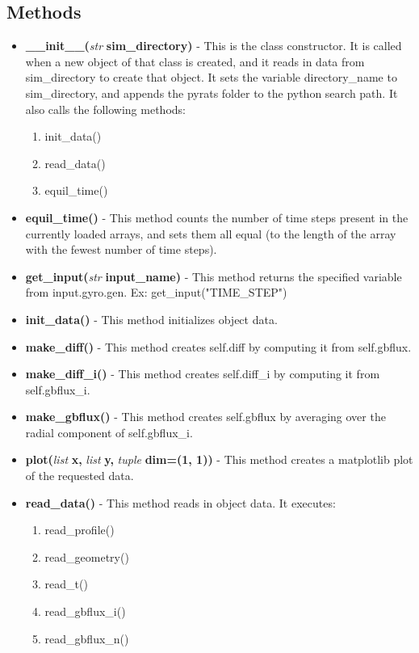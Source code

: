 \documentclass{article}
\begin{document}
\subsection{Methods}
\begin{itemize}
\item \textbf{\_\_init\_\_(}\emph{str}\textbf{ sim\_directory)} - This is the class constructor.  It is called when a new object of that class is created, and it reads in data from sim\_directory to create that object.  It sets the variable directory\_name to sim\_directory, and appends the pyrats folder to the python search path.  It also calls the following methods:
\begin{enumerate}
\item init\_data()
\item read\_data()
\item equil\_time()
\end{enumerate}
\item \textbf{equil\_time()} - This method counts the number of time steps present in the currently loaded arrays, and sets them all equal (to the length of the array with the fewest number of time steps).
\item \textbf{get\_input(}\emph{str}\textbf{ input\_name)} - This method returns the specified variable from input.gyro.gen.  Ex: get\_input("TIME\_STEP")
\item \textbf{init\_data()} - This method initializes object data.
\item \textbf{make\_diff()} - This method creates self.diff by computing it from self.gbflux.
\item \textbf{make\_diff\_i()} - This method creates self.diff\_i by computing it from self.gbflux\_i.
\item \textbf{make\_gbflux()} - This method creates self.gbflux by averaging over the radial component of self.gbflux\_i.
\item \textbf{plot(}\emph{list}\textbf{ x,}\emph{ list}\textbf{ y,}\emph{ tuple}\textbf{ dim=(1, 1))} - This method creates a matplotlib plot of the requested data.
\item \textbf{read\_data()} - This method reads in object data.  It executes:
\begin{enumerate}
\item read\_profile()
\item read\_geometry()
\item read\_t()
\item read\_gbflux\_i()
\item read\_gbflux\_n()

\end{enumerate}
\end{itemize}
\end{document}
